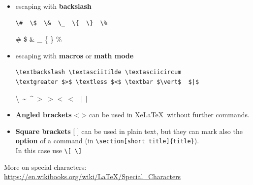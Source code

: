 \begin{frame}[fragile]

\begin{itemize}
	
%	
%

	\item escaping with \textbf{backslash} 

\begin{lstlisting}
\#  \$  \&  \_  \{  \}  \%
\end{lstlisting}
	
	\ea \#  \$  \&  \_  \{  \}  \%
	\z 
	
\pause 
	
	\item escaping with \textbf{macros} or \textbf{math mode}

\begin{lstlisting}
\textbackslash \textasciitilde \textasciicircum 
\textgreater $>$ \textless $<$ \textbar $\vert$  $|$  
\end{lstlisting}	
	\ea \textbackslash\ \textasciitilde\ \textasciicircum\ 
	\textgreater\ $>$ \textless\ $<$ \textbar\ $\vert$  $|$  
	\z 

\pause 
	
	\item \textbf{Angled brackets} < > can be used in Xe\LaTeX\ without further commands.
	
	\item \textbf{Square brackets} [ ] can be used in plain text, but they can mark also the \textbf{option} of a command (\fe in \lstinline|\section[short title]{title}|). \\
	In this case use \lstinline|\[ \]|
\end{itemize}

\bigskip 

More on special characters: \url{https://en.wikibooks.org/wiki/LaTeX/Special_Characters}
\end{frame}


